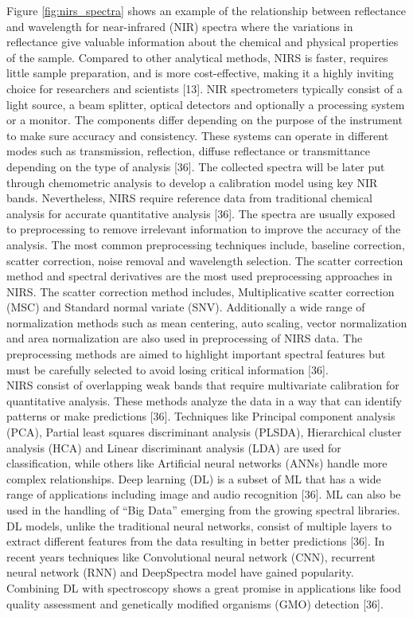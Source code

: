\documentclass[12pt,a4paper]{report}
\begin{document}
Figure \ref{fig:nirs_spectra} shows an example of the relationship between reflectance and wavelength for
near-infrared (NIR) spectra where the variations in reflectance give valuable information
about the chemical and physical properties of the sample. Compared to other analytical methods, NIRS is faster, requires little sample preparation, and is more cost-effective, making it a
highly inviting choice for researchers and scientists [13]. NIR spectrometers typically consist
of a light source, a beam splitter, optical detectors and optionally a processing system or a
monitor. The components differ depending on the purpose of the instrument to make sure accuracy
and consistency. These systems can operate in different modes such as transmission, reflection,
diffuse reflectance or transmittance depending on the type of analysis [36]. The collected spectra
will be later put through chemometric analysis to develop a calibration model using key NIR
bands. Nevertheless, NIRS require reference data from traditional chemical analysis for accurate
quantitative analysis [36]. The spectra are usually exposed to preprocessing to remove irrelevant information to improve the accuracy of the analysis. The most common preprocessing techniques
include, baseline correction, scatter correction, noise removal and wavelength selection. The
scatter correction method and spectral derivatives are the most used preprocessing approaches
in NIRS. The scatter correction method includes, Multiplicative scatter correction (MSC) and
Standard normal variate (SNV). Additionally a wide range of normalization methods such as
mean centering, auto scaling, vector normalization and area normalization are also used in preprocessing of NIRS data. The preprocessing methods are aimed to highlight important spectral
features but must be carefully selected to avoid losing critical information [36]. \\

NIRS consist of overlapping weak bands that require multivariate calibration for quantitative analysis. These methods analyze the data in a way that can identify patterns or make predictions [36]. Techniques like Principal component analysis (PCA), Partial least squares discriminant analysis (PLSDA), Hierarchical cluster analysis (HCA) and Linear discriminant analysis (LDA) are used for classification, while others like Artificial neural networks (ANNs) handle more complex relationships. 
Deep learning (DL) is a subset of ML that has a wide range of applications including image and audio recognition [36]. ML can also be used in the handling of “Big Data” emerging from the growing spectral libraries. DL models, unlike the traditional neural networks, consist of multiple layers to extract different features from the data resulting in better predictions [36]. In recent years techniques like Convolutional neural network (CNN), recurrent neural network (RNN) and DeepSpectra 
model have gained popularity. Combining DL with spectroscopy shows a great promise in applications like food quality assessment and genetically modified organisms (GMO) detection [36].\\
\end{document}
